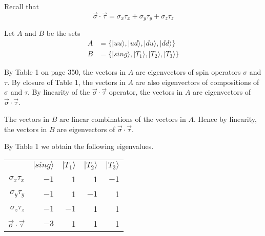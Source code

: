 


\bigskip
Recall that
\begin{equation*}
\vec\sigma\cdot\vec\tau=\sigma_x\tau_x+\sigma_y\tau_y+\sigma_z\tau_z
\end{equation*}

Let $A$ and $B$ be the sets
\begin{align*}
A&=\{|uu\rangle, |ud\rangle, |du\rangle, |dd\rangle\}
\\
B&=\{|sing\rangle, |T_1\rangle, |T_2\rangle, |T_3\rangle\}
\end{align*}

By Table 1 on page 350, the vectors in $A$ are eigenvectors of spin operators $\sigma$ and $\tau$.
By closure of Table 1, the vectors in $A$ are also eigenvectors of compositions of $\sigma$ and $\tau$.
By linearity of the $\vec\sigma\cdot\vec\tau$ operator, the vectors in $A$ are eigenvectors of $\vec\sigma\cdot\vec\tau$.

\bigskip
The vectors in $B$ are linear combinations of the vectors in $A$.
Hence by linearity, the vectors in $B$ are eigenvectors of $\vec\sigma\cdot\vec\tau$.

\bigskip
By Table 1 we obtain the following eigenvalues.
\begin{center}
\begin{tabular}{rrrrr}
& $|sing\rangle$ & $|T_1\rangle$ & $|T_2\rangle$ & $|T_3\rangle$
\\[1ex]
$\sigma_x\tau_x$ & $-1$ & 1 & 1 & $-1$
\\
$\sigma_y\tau_y$ & $-1$ & 1 & $-1$ & 1
\\
$\sigma_z\tau_z$ & $-1$ & $-1$ & 1 & 1
\\[1ex]
$\vec\sigma\cdot\vec\tau$ & $-3$ & 1 & 1 & 1
\end{tabular}
\end{center}


